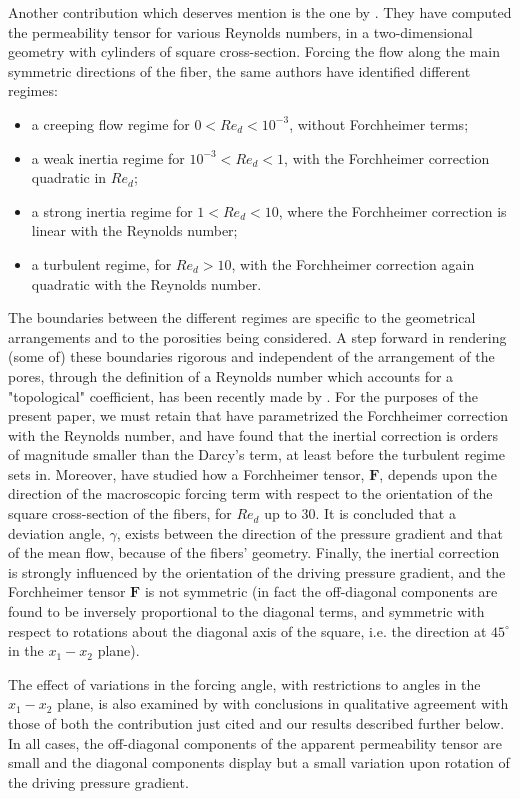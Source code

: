 Another contribution which deserves mention is the one by \citet{lasseux}. They have computed the permeability tensor 
for various Reynolds numbers, in a two-dimensional geometry with cylinders of square cross-section.
Forcing the flow along the main symmetric directions of the fiber, the same authors have identified different regimes:
\begin{itemize}
	\item a creeping flow regime for $ 0 < Re_d < 10^{-3}$, without Forchheimer terms;
	\item a weak inertia regime for $10^{-3} < Re_d < 1$, with the Forchheimer correction quadratic in $Re_d$; 
	\item a strong inertia regime for $1 < Re_d < 10$, where the Forchheimer correction is linear with the Reynolds number; 
	\item a turbulent regime, for  $Re_d > 10 $, with the Forchheimer correction again quadratic with the Reynolds number.
\end{itemize}  
The boundaries between the different regimes are specific to the geometrical arrangements and to the porosities being considered. A step forward in rendering (some of) these boundaries rigorous and independent of the arrangement of the pores, through the definition 
of a Reynolds number which accounts for a "topological" coefficient, has been recently made by \citet{pauthenet}. 
For the purposes of the present paper, we must retain that \citet{lasseux} have parametrized the Forchheimer correction with the Reynolds 
number, and have found that the inertial correction is orders of magnitude smaller than the Darcy's term, at least before the turbulent 
regime sets in. Moreover, \citet{lasseux} have studied how a Forchheimer tensor, $\mathbf{F}$, depends upon the direction of the
macroscopic forcing term with respect to the orientation of the square cross-section of the fibers, for  $Re_d$ up to 30.
It is concluded that a deviation angle, $\gamma$, exists between the direction of the pressure gradient and that of the mean flow,
because of the fibers' geometry. Finally, the inertial correction is strongly influenced by the orientation
of the driving pressure gradient, and the Forchheimer tensor $\mathbf{F}$ is not symmetric (in fact the off-diagonal components 
are found to be inversely proportional to the diagonal terms, and symmetric with respect to rotations about the diagonal axis of 
the square, i.e. the direction at $45^\circ$ in the $x_1 - x_2$ plane).

The effect of variations in the forcing angle, with restrictions to angles in the $x_1 - x_2$ plane, is also examined by 
\citet{soulaine2014} with conclusions in qualitative agreement with those of  both the contribution just cited and our results  
described further below. In all cases, the off-diagonal components of the apparent permeability tensor are small and the diagonal 
components display but a small variation upon rotation of the driving pressure gradient.


